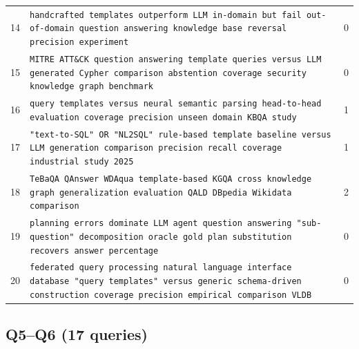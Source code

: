 \documentclass[11pt,a4paper]{article}
\begin{document}
\begin{center}
\begin{longtable}{@{}c>{\RaggedRight}p{13.6cm}c@{}}
14 & \texttt{handcrafted templates outperform LLM in-domain but fail out-of-domain question answering knowledge base reversal precision experiment} & 0 \\
15 & \texttt{MITRE ATT\&CK question answering template queries versus LLM generated Cypher comparison abstention coverage security knowledge graph benchmark} & 0 \\
16 & \texttt{query templates versus neural semantic parsing head-to-head evaluation coverage precision unseen domain KBQA study} & 1 \\
17 & \texttt{"text-to-SQL" OR "NL2SQL" rule-based template baseline versus LLM generation comparison precision recall coverage industrial study 2025} & 1 \\
18 & \texttt{TeBaQA QAnswer WDAqua template-based KGQA cross knowledge graph generalization evaluation QALD DBpedia Wikidata comparison} & 2 \\
19 & \texttt{planning errors dominate LLM agent question answering "sub-question" decomposition oracle gold plan substitution recovers answer percentage} & 0 \\
20 & \texttt{federated query processing natural language interface database "query templates" versus generic schema-driven construction coverage precision empirical comparison VLDB} & 0 \\
\bottomrule
\end{longtable}
\end{center}

\subsection{Q5--Q6 (17 queries)}
\end{document}
